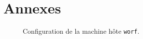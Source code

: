 \section*{Annexes}

\begin{figure}[!ht]
  \caption{Configuration de la machine hôte \texttt{worf}.}
  \label{fig:lstopo}
\end{figure}
